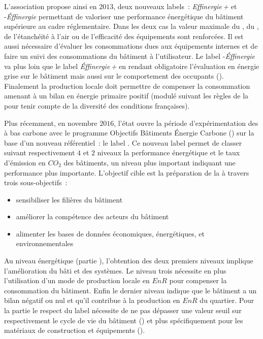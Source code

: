 L’association 
propose ainsi en $2013$, deux nouveaux labels~: \textit{Effinergie\,+} et
-\textit{Éffinergie} permettant de valoriser une performance énergétique du
bâtiment supérieure au cadre réglementaire. Dans les deux cas la valeur maximale du
, du , de l’étanchéité à l’air ou de l’efficacité des
équipements sont renforcées. Il est aussi nécessaire d’évaluer les consommations dues aux
équipements internes et de faire un suivi des consommations du bâtiment à l’utilisateur.
Le label -\textit{Éffinergie} va plus loin que le label \textit{Éffinergie\,+}
en rendant obligatoire l’évaluation en énergie grise sur le bâtiment mais aussi sur le
comportement des occupants ().
Finalement la production locale doit permettre de compenser la consommation amenant à un
bilan en énergie primaire positif (modulé suivant les règles de la  pour
tenir compte de la diversité des conditions françaises).

Plus récemment, en novembre $2016$, l’état ouvre la période d’expérimentation des
 à bas carbone avec le programme Objectifs Bâtiments Énergie Carbone
() sur la base d’un nouveau référentiel~: le label 
\parencite{Ministere2016}. Ce nouveau label permet de classer suivant respectivement $4$
et $2$ niveaux la performance énergétique et le taux d’émission en $CO_{2}$ des bâtiments,
un niveau plus important indiquant une performance plus importante. L’objectif cible est
la préparation de la  à travers trois sous-objectifs~:
\begin{itemize}
    \item sensibiliser les filières du bâtiment
    \item améliorer la compétence des acteurs du bâtiment
    \item alimenter les bases de données économiques, énergétiques, et environnementales
\end{itemize}
Au niveau énergétique (partie ), l’obtention des deux premiers niveaux implique
l’amélioration du bâti et des systèmes. Le niveau trois nécessite en plus l’utilisation
d’un mode de production locale en $EnR$ pour compenser la consommation du bâtiment. Enfin
le dernier niveau indique que le bâtiment a un bilan négatif ou nul et qu’il contribue à
la production en $EnR$ du quartier. Pour la partie  le respect du label nécessite
de ne pas dépasser une valeur seuil sur respectivement le cycle de vie du bâtiment
() et plus spécifiquement pour les matériaux de construction et
équipements ().

